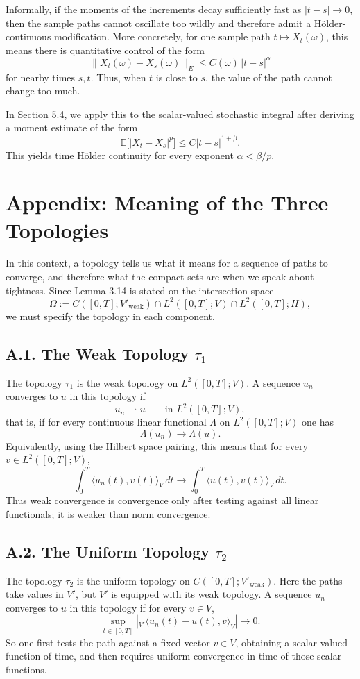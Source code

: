 \documentclass[11pt]{article}
\theoremstyle{definition}
\theoremstyle{remark}
\newcommand{\dual}[2]{{}_{V'}\langle #1, #2 \rangle_{V}}
\begin{document}
Informally, if the moments of the increments decay sufficiently fast as $|t-s|\to 0$, then the sample paths cannot oscillate too wildly and therefore admit a H\"older-continuous modification. More concretely, for one sample path $t\mapsto X_t(\omega)$, this means there is quantitative control of the form
\[
  \|X_t(\omega)-X_s(\omega)\|_E
  \le
  C(\omega)\,|t-s|^\alpha
\]
for nearby times $s,t$. Thus, when $t$ is close to $s$, the value of the path cannot change too much.

In Section 5.4, we apply this to the scalar-valued stochastic integral after deriving a moment estimate of the form
\[
  \mathbb E\bigl[|X_t-X_s|^p\bigr]\le C|t-s|^{1+\beta}.
\]
This yields time H\"older continuity for every exponent $\alpha<\beta/p$.

\section*{Appendix: Meaning of the Three Topologies}
In this context, a topology tells us what it means for a sequence of paths to converge, and therefore what the compact sets are when we speak about tightness. Since Lemma 3.14 is stated on the intersection space
\[
  \Omega:=C([0,T];V'_{\mathrm{weak}})\cap L^2([0,T];V)\cap L^2([0,T];H),
\]
we must specify the topology in each component.

\subsection*{A.1. The Weak Topology $\tau_1$}
The topology $\tau_1$ is the weak topology on $L^2([0,T];V)$. A sequence $u_n$ converges to $u$ in this topology if
\[
  u_n\rightharpoonup u
  \qquad \text{in } L^2([0,T];V),
\]
that is, if for every continuous linear functional $\Lambda$ on $L^2([0,T];V)$ one has
\[
  \Lambda(u_n)\to \Lambda(u).
\]
Equivalently, using the Hilbert space pairing, this means that for every $v\in L^2([0,T];V)$,
\[
  \int_0^T \langle u_n(t),v(t)\rangle_V\,dt
  \to
  \int_0^T \langle u(t),v(t)\rangle_V\,dt.
\]
Thus weak convergence is convergence only after testing against all linear functionals; it is weaker than norm convergence.

\subsection*{A.2. The Uniform Topology $\tau_2$}
The topology $\tau_2$ is the uniform topology on $C([0,T];V'_{\mathrm{weak}})$. Here the paths take values in $V'$, but $V'$ is equipped with its weak topology. A sequence $u_n$ converges to $u$ in this topology if for every $v\in V$,
\[
  \sup_{t\in[0,T]}
  \left|
    \dual{u_n(t)-u(t)}{v}
  \right|
  \to 0.
\]
So one first tests the path against a fixed vector $v\in V$, obtaining a scalar-valued function of time, and then requires uniform convergence in time of those scalar functions.
\end{document}
